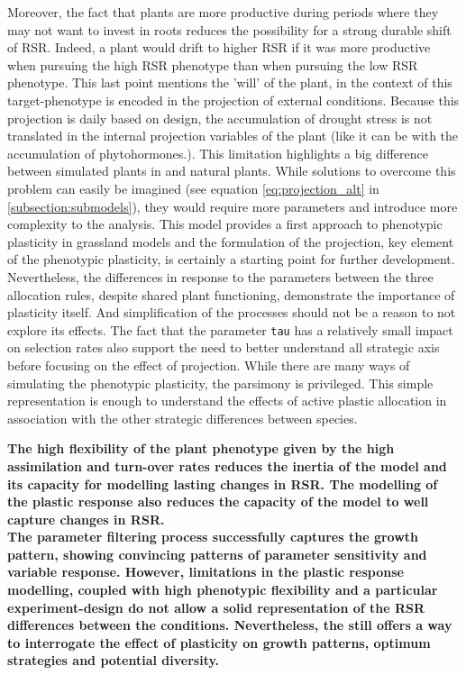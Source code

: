 Moreover, the fact that plants are more productive during periods where they may not want to invest in roots reduces the possibility for a strong durable shift of RSR. Indeed, a plant would drift to higher RSR if it was more productive when pursuing the high RSR phenotype than when pursuing the low RSR phenotype. This last point mentions the 'will' of the plant, in the context of \model this target-phenotype is encoded in the projection of external conditions. Because this projection is daily based on design, the accumulation of drought stress is not translated in the internal projection variables of the plant (like it can be with the accumulation of phytohormones.). This limitation highlights a big difference between simulated plants in \model and natural plants. While solutions to overcome this problem can easily be imagined (see equation \ref{eq:projection_alt} in \ref{subsection:submodels}), they would require more parameters and introduce more complexity to the analysis. This model provides a first approach to phenotypic plasticity in grassland models and the formulation of the projection, key element of the phenotypic plasticity, is certainly a starting point for further development. Nevertheless, the differences in response to the parameters between the three allocation rules, despite shared plant functioning, demonstrate the importance of plasticity itself. And simplification of the processes should not be a reason to not explore its effects. The fact that the parameter \texttt{tau} has a relatively small impact on selection rates also support the need to better understand all strategic axis before focusing on the effect of projection. While there are many ways of simulating the phenotypic plasticity, the parsimony is privileged. This simple representation is enough to understand the effects of active plastic allocation in association with the other strategic differences between species.

\textbf{The high flexibility of the plant phenotype given by the high assimilation and turn-over rates reduces the inertia of the model and its capacity for modelling lasting changes in RSR. The modelling of the plastic response also reduces the capacity of the model to well capture changes in RSR. }\\

\textbf{The parameter filtering process successfully captures the growth pattern, showing convincing patterns of parameter sensitivity and variable response. However, limitations in the plastic response modelling, coupled with high phenotypic flexibility and a particular experiment-design do not allow a solid representation of the RSR differences between the conditions. Nevertheless, the \model still offers a way to interrogate the effect of plasticity on growth patterns, optimum strategies and potential diversity.}

